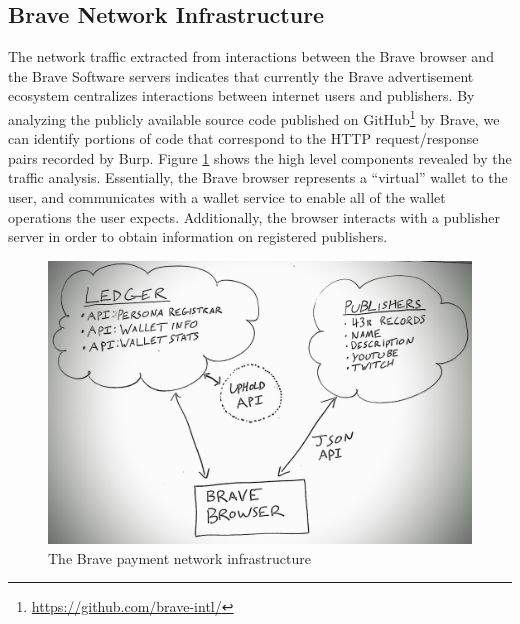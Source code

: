 \documentclass[sigconf]{acmart}
\begin{document}
\subsection{Brave Network Infrastructure}
\label{sec:brave_infra}
The network traffic extracted from
interactions between the Brave
browser and the Brave Software servers
indicates that currently the Brave
advertisement ecosystem centralizes
interactions between internet users and publishers.
By analyzing the publicly available source code
published on GitHub\footnote{\url{https://github.com/brave-intl/}}
by Brave, we can identify portions of code
that correspond to the HTTP request/response 
pairs recorded by Burp.
Figure \ref{fig:brave_infra} shows the high level
components revealed by the traffic analysis.
Essentially, the Brave browser represents a ``virtual''
wallet to the user, and communicates with a wallet service
to enable all of the wallet operations the user expects.
Additionally, the browser interacts with a publisher
server in order to obtain information on registered publishers.
\begin{figure}
\includegraphics[scale=0.07]{brave-network-infra.jpg}
\caption{The Brave payment network infrastructure}
\label{fig:brave_infra}
\end{figure}
\end{document}

